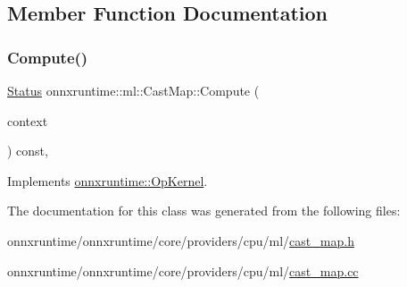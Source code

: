 \subsection{Member Function Documentation}
\mbox{\label{classonnxruntime_1_1ml_1_1CastMap_a9b304b1ab42b9ad49175196e58f74e12}} 
\subsubsection{\texorpdfstring{Compute()}{Compute()}}
{\footnotesize\ttfamily \mbox{\hyperlink{classonnxruntime_1_1common_1_1Status}{Status}} onnxruntime\+::ml\+::\+Cast\+Map\+::\+Compute (\begin{DoxyParamCaption}\item[{\mbox{\hyperlink{classonnxruntime_1_1OpKernelContext}{Op\+Kernel\+Context}} $\ast$}]{context }\end{DoxyParamCaption}) const\hspace{0.3cm}{\ttfamily [override]}, {\ttfamily [virtual]}}



Implements \mbox{\hyperlink{classonnxruntime_1_1OpKernel_a9eca8656a78b1b3ab9d3351a12798650}{onnxruntime\+::\+Op\+Kernel}}.



The documentation for this class was generated from the following files\+:\begin{DoxyCompactItemize}
\item 
onnxruntime/onnxruntime/core/providers/cpu/ml/\mbox{\hyperlink{cast__map_8h}{cast\+\_\+map.\+h}}\item 
onnxruntime/onnxruntime/core/providers/cpu/ml/\mbox{\hyperlink{cast__map_8cc}{cast\+\_\+map.\+cc}}\end{DoxyCompactItemize}
